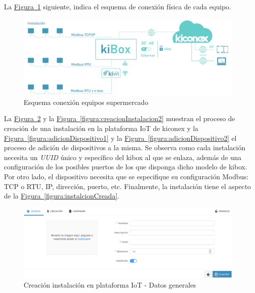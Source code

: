La \hyperref[figura:esquemaConexion]{Figura~\ref{figura:esquemaConexion}} siguiente, indica el esquema de conexión física de cada equipo.

\begin{figure}[H]
  \centering
  \includegraphics[width=\textwidth, keepaspectratio]{img/esquemaConexion}
  \caption{Esquema conexión equipos supermercado}
  \label{figura:esquemaConexion}
\end{figure}

La \hyperref[figura:creacionInstalacion1]{Figura~\ref{figura:creacionInstalacion1}} y la \hyperref[figura:creacionInstalacion2]{Figura~\ref{figura:creacionInstalacion2}} muestran el proceso de creación de una instalación en la plataforma IoT de kiconex y la \hyperref[figura:adicionDispositivo1]{Figura~\ref{figura:adicionDispositivo1}} y la \hyperref[figura:adicionDispositivo2]{Figura~\ref{figura:adicionDispositivo2}} el proceso de adición de dispositivos a la misma. Se observa como cada instalación necesita un \textit{UUID} único y específico del kibox al que se enlaza, además de una configuración de los posibles puertos de los que disponga dicho modelo de kibox. Por otro lado, el dispositivo necesita que se especifique su configuración Modbus: TCP o RTU, IP, dirección, puerto, etc. Finalmente, la instalación tiene el aspecto de la \hyperref[figura:instalcionCreada]{Figura~\ref{figura:instalcionCreada}}.



\vspace*{\fill}

\begin{figure}[H]
  \centering
  \includegraphics[width=\textwidth, keepaspectratio]{img/creacionInstalacionGeneral}
  \caption{Creación instalación en plataforma IoT - Datos generales}
  \label{figura:creacionInstalacion1}
\end{figure}

